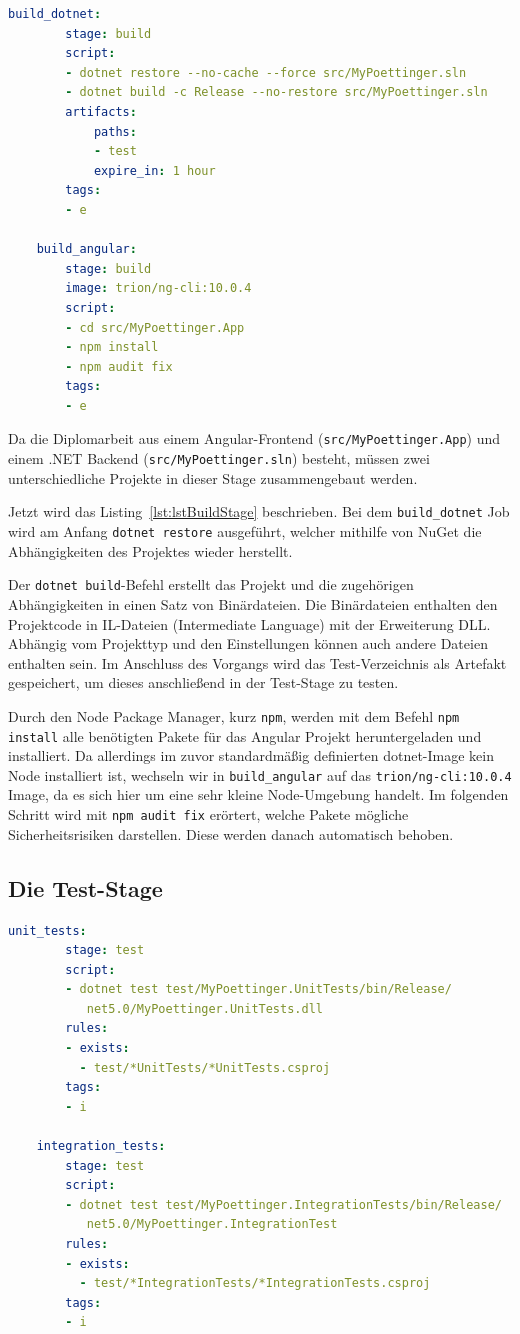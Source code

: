 \begin{lstlisting}[caption={Die Build-Stage der gitlab-ci.yml Datei}, language=yaml, label={lst:lstBuildStage}]
	build_dotnet:
		stage: build
		script:
		- dotnet restore --no-cache --force src/MyPoettinger.sln
		- dotnet build -c Release --no-restore src/MyPoettinger.sln
  		artifacts:
			paths:
			- test
			expire_in: 1 hour
		tags:
		- e
	
	build_angular:
		stage: build
		image: trion/ng-cli:10.0.4
		script: 
		- cd src/MyPoettinger.App
		- npm install
		- npm audit fix
		tags:
		- e
\end{lstlisting}

Da die Diplomarbeit aus einem Angular-Frontend (\texttt{src/MyPoettinger.App}) und einem .NET Backend (\texttt{src/MyPoettinger.sln}) besteht, müssen zwei unterschiedliche Projekte in dieser Stage zusammengebaut werden. 

Jetzt wird das Listing~\ref{lst:lstBuildStage} beschrieben. Bei dem \texttt{build\_dotnet} Job wird am Anfang \texttt{dotnet restore} ausgeführt, welcher mithilfe von NuGet die Abhängigkeiten des Projektes wieder herstellt. 

Der \texttt{dotnet build}-Befehl erstellt das Projekt und die zugehörigen Abhängigkeiten in einen Satz von Binärdateien. Die Binärdateien enthalten den Projektcode in IL-Dateien (Intermediate Language) mit der Erweiterung DLL. Abhängig vom Projekttyp und den Einstellungen können auch andere Dateien enthalten sein.\cite{dotnetBuildDesc} Im Anschluss des Vorgangs wird das Test-Verzeichnis als Artefakt gespeichert, um dieses anschließend in der Test-Stage zu testen.

Durch den Node Package Manager, kurz \texttt{npm}, werden mit dem Befehl \texttt{npm install} alle benötigten Pakete für das Angular Projekt heruntergeladen und installiert. Da allerdings im zuvor standardmäßig definierten dotnet-Image kein Node installiert ist, wechseln wir in \texttt{build\_angular} auf das \texttt{trion/ng-cli:10.0.4} Image, da es sich hier um eine sehr kleine Node-Umgebung handelt. Im folgenden Schritt wird mit \texttt{npm audit fix} erörtert, welche Pakete mögliche Sicherheitsrisiken darstellen. Diese werden danach automatisch behoben. 

\subsection{Die Test-Stage}

\begin{lstlisting}[caption={Die Test-Stage der gitlab-ci.yml Datei}, language=yaml, label={lst:lstTestStage}]
	unit_tests:
		stage: test
		script: 
		- dotnet test test/MyPoettinger.UnitTests/bin/Release/
		   net5.0/MyPoettinger.UnitTests.dll
		rules:
		- exists:
		  - test/*UnitTests/*UnitTests.csproj
		tags:
		- i  
	
	integration_tests:
		stage: test
		script: 
		- dotnet test test/MyPoettinger.IntegrationTests/bin/Release/
		   net5.0/MyPoettinger.IntegrationTest
		rules:
		- exists:
		  - test/*IntegrationTests/*IntegrationTests.csproj
		tags:
		- i
\end{lstlisting}

